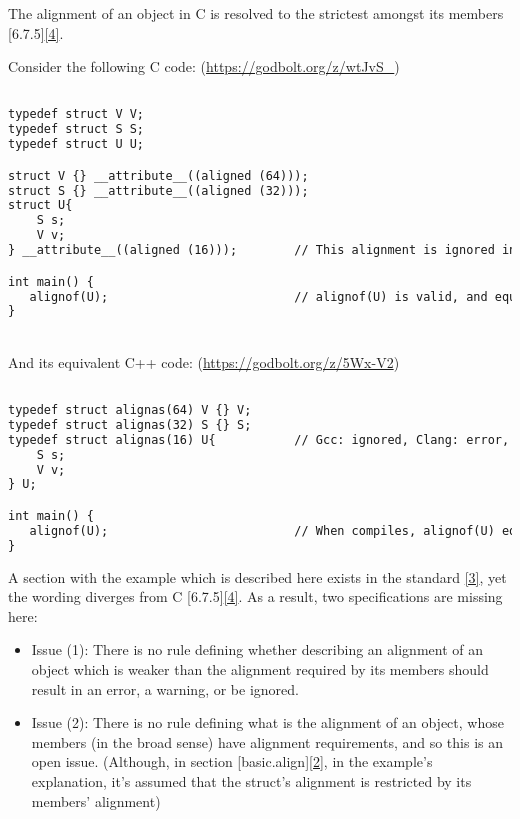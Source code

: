 \documentclass[11pt]{article}
\begin{document}
The alignment of an object in C is resolved to the strictest amongst its members [6.7.5]\hyperlink{6.7.5}{[4]}.

Consider the following C code:  (\url{https://godbolt.org/z/wtJvS_})
\begin{lstlisting}[language=diff] 

typedef struct V V;
typedef struct S S;
typedef struct U U;

struct V {} __attribute__((aligned (64))); 
struct S {} __attribute__((aligned (32))); 
struct U{
    S s;
    V v;
} __attribute__((aligned (16)));        // This alignment is ignored in both gcc and clang

int main() {
   alignof(U);                          // alignof(U) is valid, and equals 64
}

\end{lstlisting}

\\And its equivalent C++ code: (\url{https://godbolt.org/z/5Wx-V2})
\begin{lstlisting}[language=diff]

typedef struct alignas(64) V {} V; 
typedef struct alignas(32) S {} S; 
typedef struct alignas(16) U{           // Gcc: ignored, Clang: error, MSVC: warning. (1)
    S s;
    V v;
} U; 

int main() {
   alignof(U);                          // When compiles, alignof(U) equals 64. (2)
}

\end{lstlisting}

A section with the example which is described here exists in the standard \hyperlink{9.12.2/5}{[3]}, yet the wording diverges from C [6.7.5]\hyperlink{6.7.5}{[4]}. 
As a result, two specifications are missing here: 
\begin{itemize}
    \item Issue (1): There is no rule defining whether describing an alignment of an object which is weaker than the alignment required by its members should result in an error, a warning, or be ignored.
    \item Issue (2): There is no rule defining what is the alignment of an object, whose members (in the broad sense) have alignment requirements, and so this is an open issue. (Although, in section [basic.align]\hyperlink{6.7.6/2}{[2]}, in the example's explanation, it's assumed that the struct's alignment is restricted by its members' alignment) 
\end{itemize}
\end{document}
